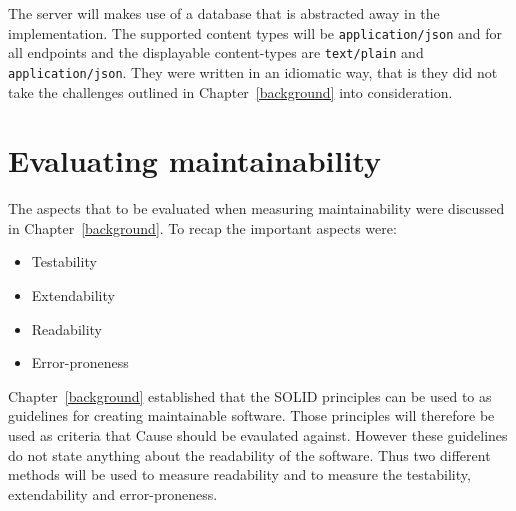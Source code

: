 The server will makes use of a database that is abstracted away in the
implementation. The supported content types will be \texttt{application/json}
and for all endpoints and the displayable content-types are \texttt{text/plain}
and \texttt{application/json}.  They were written in an idiomatic way, that is
they did not take the challenges outlined in Chapter~\ref{background} into
consideration.

\section{Evaluating maintainability}\label{evaluatingmaintainability}

The aspects that to be evaluated when measuring maintainability were discussed
in Chapter~\ref{background}. To recap the important aspects were:

\begin{itemize}
    \item Testability
    \item Extendability
    \item Readability
    \item Error-proneness
\end{itemize}

Chapter~\ref{background} established that the SOLID principles can be used to
as guidelines for creating maintainable software. Those principles will
therefore be used as criteria that Cause should be evaulated against.  However
these guidelines do not state anything about the readability of the software.
Thus two different methods will be used to measure readability and to measure
the testability, extendability and error-proneness.





